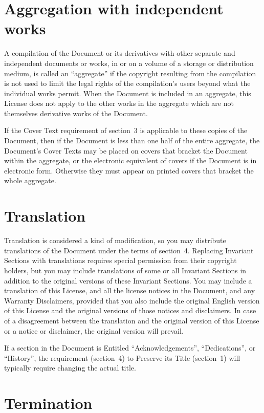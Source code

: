 \documentclass[a4paper,spanish,12pt]{book}
\begin{document}
\section{Aggregation with independent works}

A compilation of the Document or its derivatives with other separate
and independent documents or works, in or on a volume of a storage or
distribution medium, is called an ``aggregate'' if the copyright
resulting from the compilation is not used to limit the legal rights
of the compilation's users beyond what the individual works permit.
When the Document is included in an aggregate, this License does not
apply to the other works in the aggregate which are not themselves
derivative works of the Document.

If the Cover Text requirement of section~3 is applicable to these
copies of the Document, then if the Document is less than one half of
the entire aggregate, the Document's Cover Texts may be placed on
covers that bracket the Document within the aggregate, or the
electronic equivalent of covers if the Document is in electronic form.
Otherwise they must appear on printed covers that bracket the whole
aggregate.

\section{Translation}

Translation is considered a kind of modification, so you may
distribute translations of the Document under the terms of section~4.
Replacing Invariant Sections with translations requires special
permission from their copyright holders, but you may include
translations of some or all Invariant Sections in addition to the
original versions of these Invariant Sections.  You may include a
translation of this License, and all the license notices in the
Document, and any Warranty Disclaimers, provided that you also include
the original English version of this License and the original versions
of those notices and disclaimers.  In case of a disagreement between
the translation and the original version of this License or a notice
or disclaimer, the original version will prevail.

If a section in the Document is Entitled ``Acknowledgements'',
``Dedications'', or ``History'', the requirement (section~4) to Preserve
its Title (section~1) will typically require changing the actual
title.


\section{Termination}
\end{document}
